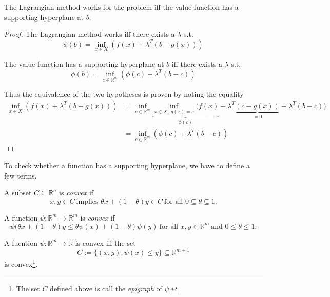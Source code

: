 \documentclass[a4paper]{article}
\begin{document}
\begin{theorem}
  The Lagrangian method works for the problem iff the value function has a supporting hyperplane at $b$.
\end{theorem}

\begin{proof}
  The Lagrangian method works iff there exists a $\lambda$ s.t.
  \[
   \phi(b) = \inf_{x \in X} (f(x) + \lambda^T (b - g(x)))
  \]

  The value function has a supporting hyperplane at $b$ iff there exists a $\lambda$ s.t.
  \[
   \phi(b) = \inf_{c \in \mathbb{R}^m} (\phi(c) + \lambda^T (b - c))
  \]

  Thus the equivalence of the two hypotheses is proven by noting the equality
  \begin{align*}
    \inf_{x \in X} (f(x) + \lambda^T (b - g(x))) &= \inf_{c \in \mathbb{R}^m} \underbrace{\inf_{x \in X,\: g(x) = c} (f(x)}_{\phi(c)} + \lambda^T \underbrace{(c - g(x))}_{= 0} + \lambda^T (b - c)) \\
                                         &= \inf_{c \in \mathbb{R}^m} (\phi(c) + \lambda^T (b - c))
  \end{align*}
\end{proof}

To check whether a function has a supporting hyperplane, we have to define a few terms.

\begin{definition}
  A subset $C \subseteq \mathbb{R}^n$ is \emph{convex} if
  \[
    x, y \in C \: \text{implies } \theta x + (1 - \theta)y \in C \: \text{for all } 0 \subseteq \theta \subseteq 1.
  \]
\end{definition}

\begin{definition}
  A function $\psi: \mathbb{R}^m \rightarrow \mathbb{R}^m$ is \emph{convex} if
  \[
    \psi(\theta x + (1 - \theta) y \leq \theta\psi(x) + (1-\theta) \psi(y) \: \text{for all } x, y \in \mathbb{R}^m \: \text{and } 0 \leq \theta \leq 1.
  \]
\end{definition}

\begin{corollary}
  A fucntion $\psi : \mathbb{R}^m \rightarrow \mathbb{R}$ is convex iff the set
  \[
    C := \{(x, y) : \psi(x) \leq y \} \subseteq \mathbb{R}^{m + 1}
  \]
  is convex\footnote{The set $C$ defined above is call the \emph{epigraph} of $\psi$.}.
\end{corollary}
\end{document}
